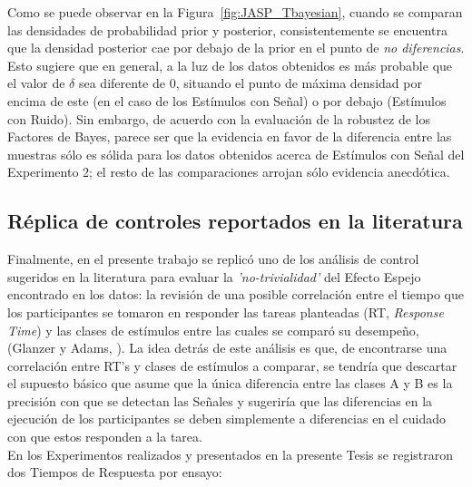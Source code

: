 Como se puede observar en la Figura~\ref{fig:JASP_Tbayesian}, cuando se comparan las densidades de probabilidad prior y posterior, consistentemente se encuentra que la densidad posterior cae por debajo de la prior en el punto de \textit{no diferencias}. Esto sugiere que en general, a la luz de los datos obtenidos es más probable que el valor de $\delta$ sea diferente de $0$, situando el punto de máxima densidad por encima de este (en el caso de los Estímulos con Señal) o por debajo (Estímulos con Ruido). Sin embargo, de acuerdo con la evaluación de la robustez de los Factores de Bayes, parece ser que la evidencia en favor de la diferencia entre las muestras sólo es sólida para los datos obtenidos acerca de Estímulos con Señal del Experimento 2; el resto de las comparaciones arrojan sólo evidencia anecdótica.\\















\subsection{Réplica de controles reportados en la literatura}

Finalmente, en el presente trabajo se replicó uno de los análisis de control sugeridos en la literatura para evaluar la \textit{'no-trivialidad'} del Efecto Espejo encontrado en los datos: la revisión de una posible correlación entre el tiempo que los participantes se tomaron en responder las tareas planteadas (RT, \textit{Response Time}) y las clases de estímulos entre las cuales se comparó su desempeño, (Glanzer y Adams, \citeyear{Glanzer1990}). La idea detrás de este análisis es que, de encontrarse una correlación entre RT's y clases de estímulos a comparar, se tendría que descartar el supuesto básico que asume que la única diferencia entre las clases A y B es la precisión con que se detectan las Señales y sugeriría que las diferencias en la ejecución de los participantes se deben simplemente a diferencias en el cuidado con que estos responden a la tarea.\\

En los Experimentos realizados y presentados en la presente Tesis se registraron dos Tiempos de Respuesta por ensayo:\\

